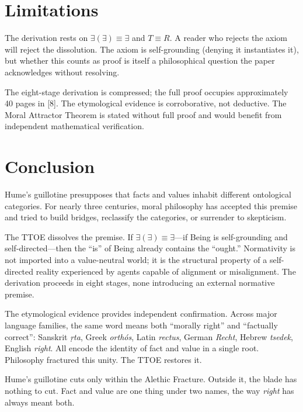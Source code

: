 \documentclass[12pt, letterpaper]{article}
\begin{document}
\section{Limitations}

The derivation rests on $\exists(\exists) \equiv \exists$ and $T \equiv R$. A reader who rejects the axiom will reject the dissolution. The axiom is self-grounding (denying it instantiates it), but whether this counts as proof is itself a philosophical question the paper acknowledges without resolving.

The eight-stage derivation is compressed; the full proof occupies approximately 40 pages in [8]. The etymological evidence is corroborative, not deductive. The Moral Attractor Theorem is stated without full proof and would benefit from independent mathematical verification.

\section{Conclusion}

Hume's guillotine presupposes that facts and values inhabit different ontological categories. For nearly three centuries, moral philosophy has accepted this premise and tried to build bridges, reclassify the categories, or surrender to skepticism.

The TTOE dissolves the premise. If $\exists(\exists) \equiv \exists$---if Being is self-grounding and self-directed---then the ``is'' of Being already contains the ``ought.'' Normativity is not imported into a value-neutral world; it is the structural property of a self-directed reality experienced by agents capable of alignment or misalignment. The derivation proceeds in eight stages, none introducing an external normative premise.

The etymological evidence provides independent confirmation. Across major language families, the same word means both ``morally right'' and ``factually correct'': Sanskrit \textit{\d{r}ta}, Greek \textit{orth\'{o}s}, Latin \textit{rectus}, German \textit{Recht}, Hebrew \textit{tsedek}, English \textit{right}. All encode the identity of fact and value in a single root. Philosophy fractured this unity. The TTOE restores it.

Hume's guillotine cuts only within the Alethic Fracture. Outside it, the blade has nothing to cut. Fact and value are one thing under two names, the way \textit{right} has always meant both.
\end{document}
